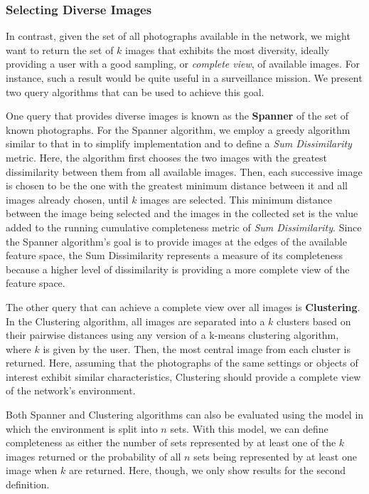 \subsubsection{Selecting Diverse Images}

In contrast, given the set of all photographs available in the network, we might want to return the set of $k$ images that exhibits the most diversity, ideally providing a user with a good sampling, or \emph{complete view}, of available images.  For instance, such a result would be quite useful in a surveillance mission.  We present two query algorithms that can be used to achieve this goal.

One query that provides diverse images is known as the {\bf Spanner} of the set of known photographs.  For the Spanner algorithm, we employ a greedy algorithm similar to that in \cite{mediascope} to simplify implementation and to define a \emph{Sum Dissimilarity} metric.  Here, the algorithm first chooses the two images with the greatest dissimilarity between them from all available images.  Then, each successive image is chosen to be the one with the greatest minimum distance between it and all images already chosen, until $k$ images are selected.  This minimum distance between the image being selected and the images in the collected set is the value added to the running cumulative completeness metric of \emph{Sum Dissimilarity}.  Since the Spanner algorithm's goal is to provide images at the edges of the available feature space, the Sum Dissimilarity represents a measure of its completeness because a higher level of dissimilarity is providing a more complete view of the feature space.

The other query that can achieve a complete view over all images is {\bf Clustering}.  In the Clustering algorithm, all images are separated into a $k$ clusters based on their pairwise distances using any version of a k-means clustering algorithm, where $k$ is given by the user.  Then, the most central image from each cluster is returned.  
Here, assuming that the photographs of the same settings or objects of interest exhibit similar characteristics, Clustering should provide a complete view of the network's environment.

Both Spanner and Clustering algorithms can also be evaluated using the model in which the environment is split into $n$ sets.  With this model, we can define completeness as either the number of sets represented by at least one of the $k$ images returned or the probability of all $n$ sets being represented by at least one image when $k$ are returned.  Here, though, we only show results for the second definition.

